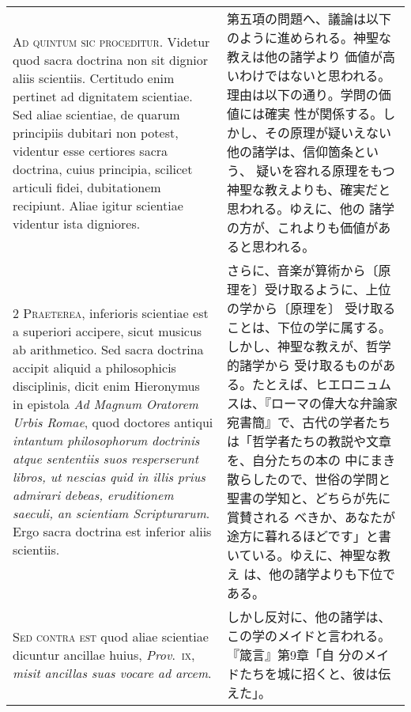 \documentclass[10pt]{jsarticle}
\begin{document}
\begin{longtable}{p{21em}p{21em}}

{\Huge A}{\scshape d quintum sic proceditur}. Videtur quod sacra
doctrina non sit dignior aliis scientiis. Certitudo enim pertinet ad
dignitatem scientiae. Sed aliae scientiae, de quarum principiis
dubitari non potest, videntur esse certiores sacra doctrina, cuius
principia, scilicet articuli fidei, dubitationem recipiunt. Aliae
igitur scientiae videntur ista digniores.


&

第五項の問題へ、議論は以下のように進められる。神聖な教えは他の諸学より
価値が高いわけではないと思われる。理由は以下の通り。学問の価値には確実
性が関係する。しかし、その原理が疑いえない他の諸学は、信仰箇条という、
疑いを容れる原理をもつ神聖な教えよりも、確実だと思われる。ゆえに、他の
諸学の方が、これよりも価値があると思われる。


\\


{\scshape 2 Praeterea}, inferioris scientiae est a superiori accipere,
sicut musicus ab arithmetico. Sed sacra doctrina accipit aliquid a
philosophicis disciplinis, dicit enim Hieronymus in epistola {\itshape
Ad Magnum Oratorem Urbis Romae}, quod doctores antiqui {\itshape
intantum philosophorum doctrinis atque sententiis suos resperserunt
libros, ut nescias quid in illis prius admirari debeas, eruditionem
saeculi, an scientiam Scripturarum}. Ergo sacra doctrina est inferior
aliis scientiis.


&

さらに、音楽が算術から〔原理を〕受け取るように、上位の学から〔原理を〕
受け取ることは、下位の学に属する。しかし、神聖な教えが、哲学的諸学から
受け取るものがある。たとえば、ヒエロニュムスは、『ローマの偉大な弁論家
宛書簡』で、古代の学者たちは「哲学者たちの教説や文章を、自分たちの本の
中にまき散らしたので、世俗の学問と聖書の学知と、どちらが先に賞賛される
べきか、あなたが途方に暮れるほどです」と書いている。ゆえに、神聖な教え
は、他の諸学よりも下位である。



\\


{\scshape Sed contra est} quod aliae scientiae dicuntur ancillae
huius, {\itshape Prov}.~{\scshape ix}, {\itshape misit ancillas suas
vocare ad arcem}.


&


しかし反対に、他の諸学は、この学のメイドと言われる。『箴言』第9章「自
分のメイドたちを城に招くと、彼は伝えた」。


\end{longtable}
\end{document}
